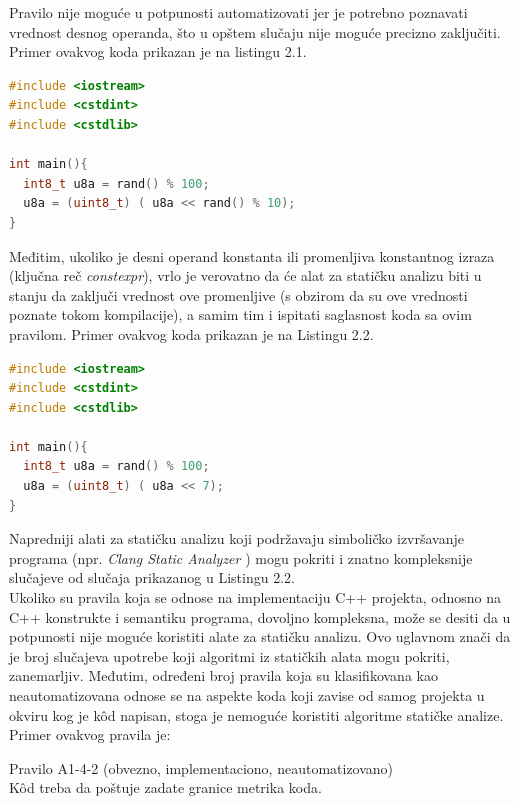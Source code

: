 \documentclass[12pt,oneside]{memoir}
\begin{document}
  Pravilo nije moguće u potpunosti automatizovati jer je potrebno poznavati vrednost desnog operanda, što u opštem slučaju nije
  moguće precizno zaključiti. Primer ovakvog koda prikazan je na listingu 2.1. \\


\begin{lstlisting}[style=customc, caption={K\^{o}d koji ilustruje nemogućnost primene statičke analize},label={lst:label1},language=C++, captionpos=b]
#include <iostream>
#include <cstdint>
#include <cstdlib>

int main(){
  int8_t u8a = rand() % 100;
  u8a = (uint8_t) ( u8a << rand() % 10);
}
\end{lstlisting}
Međitim, ukoliko je desni operand konstanta ili promenljiva konstantnog izraza (klju\v{c}na re\v{c} \textit{constexpr}), vrlo je verovatno da će alat za statičku analizu biti u stanju
  da zaključi vrednost ove promenljive (s obzirom da su ove vrednosti poznate tokom kompilacije), a samim tim i ispitati saglasnost koda sa ovim pravilom.
  Primer ovakvog koda prikazan je na Listingu 2.2. \\

\begin{lstlisting}[style=customc, caption={K\^{o}d čija se ispravnost jednostavno može utvrditi statičkom analizom},label={lst:label2},language=C++, captionpos=b]
#include <iostream>
#include <cstdint>
#include <cstdlib>

int main(){
  int8_t u8a = rand() % 100;
  u8a = (uint8_t) ( u8a << 7);
}
\end{lstlisting}

  Napredniji alati za statičku analizu koji podržavaju simboličko izvršavanje programa (npr. \textit{Clang Static Analyzer} \cite{CSAWebsite}) mogu pokriti i znatno kompleksnije 
  slučajeve od slučaja prikazanog u Listingu 2.2.
  \\
  \indent 
  Ukoliko su pravila koja se odnose na implementaciju C++ projekta, odnosno na C++ konstrukte i semantiku programa, dovoljno kompleksna, može se desiti da u potpunosti nije moguće koristiti alate za statičku analizu. Ovo uglavnom znači da je broj slučajeva upotrebe koji algoritmi iz statičkih alata mogu pokriti, zanemarljiv. Međutim, određeni broj pravila koja su klasifikovana kao neautomatizovana odnose se na aspekte koda koji zavise od samog projekta
  u okviru kog je k\^{o}d napisan, stoga je nemoguće koristiti algoritme statičke analize.
  Primer ovakvog pravila je:

\begin{center}
\begin{tcolorbox}
Pravilo A1-4-2 (obvezno, implementaciono, neautomatizovano) \\
K\^{o}d treba da poštuje zadate granice metrika koda.
\end{tcolorbox}
\end{center}
\end{document}
